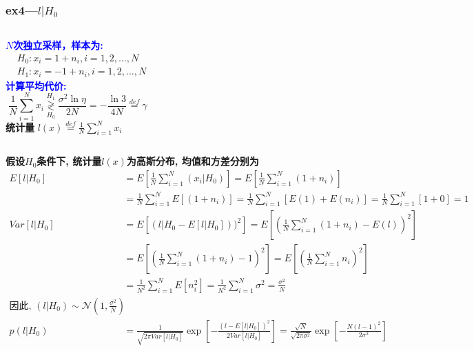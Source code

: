 \begin{frame}[shrink]
\frametitle{ex4---$l|H_0$}
\begin{columns}
	\textcolor{blue}{\textbf{$N$次独立采样，样本为:}}
	\begin{align*}
	&H_0: x_i=1+n_i, i=1,2,\dots,N\\
	&H_1: x_i=-1+n_i, i=1,2,\dots,N
	\end{align*}
	\textcolor{blue}{\textbf{计算平均代价:}}
	\[
	\frac{1}{N}\sum\limits_{i=1}^{N}x_i\mathop{\gtrless}\limits_{H_0}^{H_1}\frac{\sigma^2\ln\eta}{2N}=-\frac{\ln 3}{4N}\mathop{=}\limits^{def}\gamma
	\]
	\textbf{统计量  }\qquad $l(x)\mathop{=}\limits^{def}\frac{1}{N}\sum\limits_{i=1}^{N}x_i$\\
\end{columns}
\textbf{假设$H_0$条件下, 统计量$l(x)$为高斯分布, 均值和方差分别为}
\begin{align*}
E[l|H_0]&=E\left[\frac{1}{N}\sum\limits_{i=1}^{N}(x_i|H_0)\right]=E\left[\frac{1}{N}\sum\limits_{i=1}^{N}(1+n_i)\right]\\
&=\frac{1}{N}\sum\limits_{i=1}^{N}E[(1+n_i)]=\frac{1}{N}\sum\limits_{i=1}^{N}[E(1)+E(n_i)]=\frac{1}{N}\sum\limits_{i=1}^{N}[1+0]=1\\
Var[l|H_0]&=E\left[(l|H_0-E[l|H_0]))^2\right]=E\left[\left(\frac{1}{N}\sum\limits_{i=1}^{N}(1+n_i)-E(l)\right)^2\right]\\
&=E\left[\left(\frac{1}{N}\sum\limits_{i=1}^{N}(1+n_i)-1\right)^2\right]=E\left[\left(\frac{1}{N}\sum\limits_{i=1}^{N}n_i\right)^2\right]\\
&=\frac{1}{N^2}\sum\limits_{i=1}^{N}E[n_i^2]=\frac{1}{N^2}\sum\limits_{i=1}^{N}\sigma^2=\frac{\sigma^2}{N}\\
\textbf{因此, }(l|H_0)\sim\mathcal{N}(1,\frac{\sigma^2}{N})\\
p(l|H_0)&=\frac{1}{\sqrt{2\pi Var[l|H_0]}}\exp\left[-\frac{(l-E[l|H_0])^2}{2 Var[l|H_0]}\right]=\frac{\sqrt{N}}{\sqrt{2\pi\sigma^2}}\exp\left[-\frac{N(l-1)^2}{2\sigma^2}\right]
\end{align*}
\end{frame}

